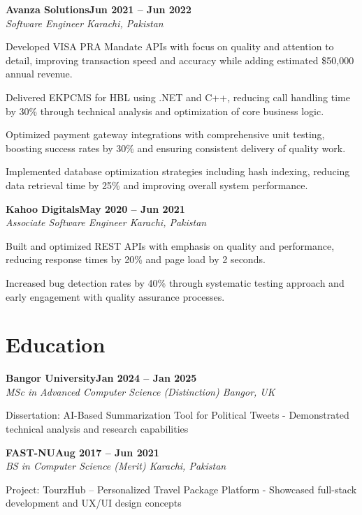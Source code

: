 \documentclass[letterpaper,10pt]{article}
\newcommand{\headingBf}[2]{
  \hspace{10pt}\textbf{#1}\hfill\textbf{#2}\\
}
\newcommand{\headingIt}[2]{
  \hspace{10pt}\textit{#1}\hfill\textit{#2}\\
}
\newenvironment{resume_list}{
  \vspace{-7pt}
  \begin{itemize}[itemsep=-2px, parsep=1pt, leftmargin=30pt]
}{
  \end{itemize}
}
\begin{document}
\headingBf{Avanza Solutions}{Jun 2021 -- Jun 2022}
\headingIt{Software Engineer \hfill Karachi, Pakistan}{}
\begin{resume_list}
    \item Developed VISA PRA Mandate APIs with focus on quality and attention to detail, improving transaction speed and accuracy while adding estimated \$50,000 annual revenue.
    \item Delivered EKPCMS for HBL using .NET and C++, reducing call handling time by 30\% through technical analysis and optimization of core business logic.
    \item Optimized payment gateway integrations with comprehensive unit testing, boosting success rates by 30\% and ensuring consistent delivery of quality work.
    \item Implemented database optimization strategies including hash indexing, reducing data retrieval time by 25\% and improving overall system performance.
\end{resume_list}

\headingBf{Kahoo Digitals}{May 2020 -- Jun 2021}
\headingIt{Associate Software Engineer \hfill Karachi, Pakistan}{}
\begin{resume_list}
    \item Built and optimized REST APIs with emphasis on quality and performance, reducing response times by 20\% and page load by 2 seconds.
    \item Increased bug detection rates by 40\% through systematic testing approach and early engagement with quality assurance processes.
\end{resume_list}

\section{Education}

\headingBf{Bangor University}{Jan 2024 -- Jan 2025}
\headingIt{MSc in Advanced Computer Science (Distinction) \hfill Bangor, UK}{}
\begin{resume_list}
    \item Dissertation: AI-Based Summarization Tool for Political Tweets - Demonstrated technical analysis and research capabilities
\end{resume_list}

\headingBf{FAST-NU}{Aug 2017 -- Jun 2021}
\headingIt{BS in Computer Science (Merit) \hfill Karachi, Pakistan}{}
\begin{resume_list}
    \item Project: TourzHub -- Personalized Travel Package Platform - Showcased full-stack development and UX/UI design concepts
\end{resume_list}
\end{document}
